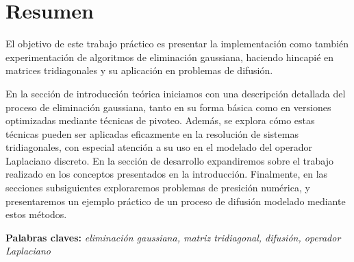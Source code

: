 \section{Resumen}
El objetivo de este trabajo práctico es presentar la implementación como también experimentación de algoritmos de eliminación gaussiana, haciendo hincapié en matrices tridiagonales y su aplicación en problemas de difusión. 

En la sección de introducción teórica iniciamos con una descripción detallada del proceso de eliminación gaussiana, tanto en su forma básica como en versiones optimizadas mediante técnicas de pivoteo. Además, se explora cómo estas técnicas pueden ser aplicadas eficazmente en la resolución de sistemas tridiagonales, con especial atención a su uso en el modelado del operador Laplaciano discreto. En la sección de desarrollo expandiremos sobre el trabajo realizado en los conceptos presentados en la introducción. Finalmente, en las secciones subsiguientes exploraremos problemas de presición numérica, y presentaremos un ejemplo práctico de un proceso de difusión modelado mediante estos métodos.

\textbf{Palabras claves:} \textit{eliminación gaussiana, matriz tridiagonal, difusión, operador Laplaciano}

